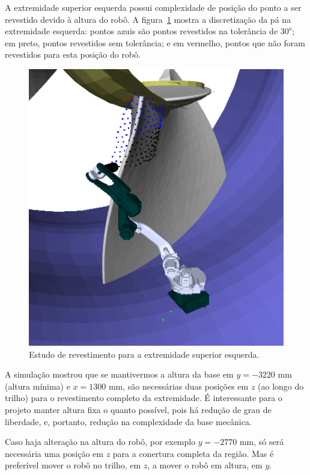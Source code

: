 A extremidade superior esquerda possui complexidade de posição do ponto a
ser revestido devido à altura do robô. A figura~\ref{fig::shoulderleft} mostra
a discretização da pá na extremidade esquerda: pontos azuis são pontos revestidos na tolerância de
$30^o$; em preto, pontos revestidos sem tolerância; e em vermelho, pontos que
não foram revestidos para esta posição do robô.

\begin{figure}[!ht]
	\centering	
	\includegraphics[width=1\columnwidth]{figs/shoulderleft.png}
	\caption{Estudo de revestimento para a extremidade superior esquerda.}
	\label{fig::shoulderleft}
\end{figure}

A simulação mostrou que se mantivermos a altura da base em $y=-3220$ mm
(altura mínima) e $x=1300$ mm, são necessárias duas posições em $z$ (ao longo do
trilho) para o revestimento completo da extremidade. É interessante para o
projeto manter altura fixa o quanto possível, pois há redução de grau de
liberdade, e, portanto, redução na complexidade da base mecânica.

Caso haja alteração na altura do robô, por exemplo  $y=-2770$ mm, só será
necessária uma posição em $z$ para a conertura completa da região. Mas é
preferível mover o robô no trilho, em $z$, a mover o robô em altura, em $y$. 

